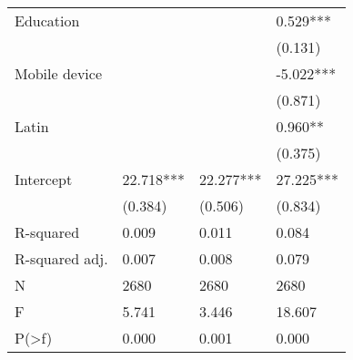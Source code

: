 \begin{tabular}{llll}
Education                         &               &               &      0.529*** \\
                                  &               &               &       (0.131) \\
Mobile device                     &               &               &     -5.022*** \\
                                  &               &               &       (0.871) \\
Latin                             &               &               &       0.960** \\
                                  &               &               &       (0.375) \\
Intercept                         &     22.718*** &     22.277*** &     27.225*** \\
                                  &       (0.384) &       (0.506) &       (0.834) \\
R-squared                         &         0.009 &         0.011 &         0.084 \\
R-squared adj.                    &         0.007 &         0.008 &         0.079 \\
N                                 &          2680 &          2680 &          2680 \\
F                                 &         5.741 &         3.446 &        18.607 \\
P(>f)                             &         0.000 &         0.001 &         0.000 \\
\bottomrule
\end{tabular}
